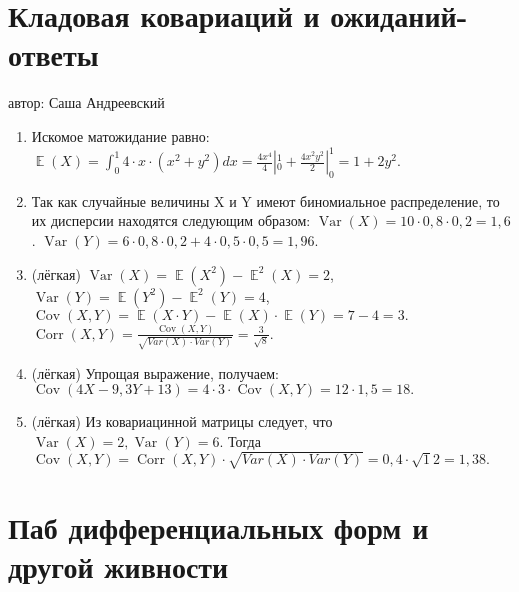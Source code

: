 \documentclass[a4paper,12pt]{article}
\DeclareMathOperator{\cov}{Cov}
\DeclareMathOperator{\Var}{Var}
\DeclareMathOperator{\Cov}{Cov}
\DeclareMathOperator{\Corr}{Corr}
\DeclareMathOperator{\E}{\mathbb{E}}
\begin{document}
\newpage
\section{Кладовая ковариаций и ожиданий-ответы}
автор: Саша Андреевский

\begin{enumerate}
\item Искомое матожидание равно:
$\E(X) = \int_0^1 4 \cdot x \cdot (x^2 + y^2)dx = \frac{4x^4}{4}|_0^1 + \frac{4x^2y^2}{2}|_0^1= 1 + 2y^2.$
\item Так как случайные величины X и Y имеют биномиальное распределение, то их дисперсии находятся следующим образом:
$\Var(X)=10\cdot0,8\cdot0,2=1,6$. $\Var(Y)=6\cdot0,8\cdot0,2 + 4\cdot0,5\cdot0,5=1,96$.
\item (лёгкая) $\Var(X)=\E(X^2)-\E^2(X)=2$,$ \Var(Y)=\E(Y^2)-\E^2(Y)=4$, $\Cov(X,Y)=\E(X\cdot Y)-\E(X)\cdot \E(Y)=7-4=3.$ $\Corr(X,Y)=\frac{\cov(X,Y)}{\sqrt{Var(X)\cdot Var(Y)}}=\frac{3}{\sqrt 8}$.

\item (лёгкая) Упрощая выражение, получаем: $\Cov(4X-9,  3Y+13)=4 \cdot 3 \cdot \Cov(X, Y) = 12 \cdot 1,5 = 18.$
\item (лёгкая) Из ковариацинной матрицы следует, что $\Var(X)=2, \Var(Y)=6$.  Тогда $\Cov(X,Y)=\Corr(X,Y) \cdot \sqrt{Var(X)\cdot Var(Y)} = 0,4 \cdot \sqrt 12 = 1,38.$
\end{enumerate}


\newpage
\section{Паб дифференциальных форм и другой живности} %
\end{document}

